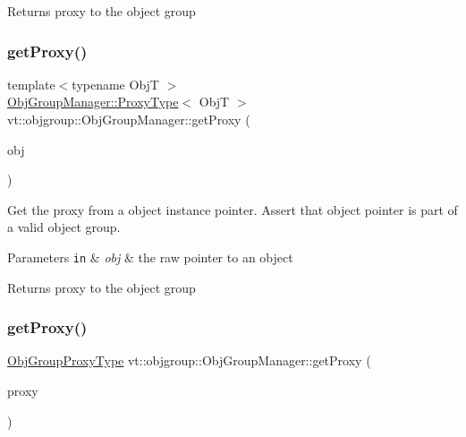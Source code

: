 \begin{DoxyReturn}{Returns}
proxy to the object group 
\end{DoxyReturn}
\mbox{\label{structvt_1_1objgroup_1_1_obj_group_manager_a9758d68a4656e7ff2eb1ac07b4feeeed}} 
\subsubsection{\texorpdfstring{get\+Proxy()}{getProxy()}\hspace{0.1cm}{\footnotesize\ttfamily [1/2]}}
{\footnotesize\ttfamily template$<$typename ObjT $>$ \\
\hyperlink{structvt_1_1objgroup_1_1_obj_group_manager_aea65eef52f240a52210132eef5ce591f}{Obj\+Group\+Manager\+::\+Proxy\+Type}$<$ ObjT $>$ vt\+::objgroup\+::\+Obj\+Group\+Manager\+::get\+Proxy (\begin{DoxyParamCaption}\item[{ObjT $\ast$}]{obj }\end{DoxyParamCaption})}



Get the proxy from a object instance pointer. Assert that object pointer is part of a valid object group. 


\begin{DoxyParams}[1]{Parameters}
\mbox{\tt in}  & {\em obj} & the raw pointer to an object\\
\hline
\end{DoxyParams}
\begin{DoxyReturn}{Returns}
proxy to the object group 
\end{DoxyReturn}
\mbox{\label{structvt_1_1objgroup_1_1_obj_group_manager_a9569c5ad1c032a90573bd987c64f560a}} 
\subsubsection{\texorpdfstring{get\+Proxy()}{getProxy()}\hspace{0.1cm}{\footnotesize\ttfamily [2/2]}}
{\footnotesize\ttfamily \hyperlink{namespacevt_ad7cae989df485fccca57f0792a880a8e}{Obj\+Group\+Proxy\+Type} vt\+::objgroup\+::\+Obj\+Group\+Manager\+::get\+Proxy (\begin{DoxyParamCaption}\item[{\hyperlink{namespacevt_ad7cae989df485fccca57f0792a880a8e}{Obj\+Group\+Proxy\+Type}}]{proxy }\end{DoxyParamCaption})}



